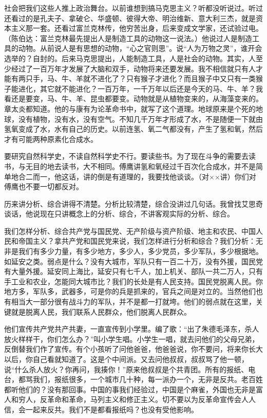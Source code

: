 社会把我们这些人推上政治舞台。以前谁想到搞马克思主义？听都没听说过。听过还看过的是孔夫子、拿破仑、华盛顿、彼得大帝、明治维新、意大利三杰，就是资本主义那一套。还看过富兰克林传，他穷苦出身，后来变成文学家，还试验过电。 （陈伯达：富兰克林最先提出人是制造工具的动物这一说法。）他说过人是制造工具的动物。从前说人是有思想的动物，“心之官则思”。说“人为万物之灵”，谁开会选举的？自封的。后来马克思提出，人能制造工具，人是社会的动物。其实，人至少经过了一百万年才发展了大脑和双手，动物将来还要发展。我不相信就只有人才能有两只手，马、牛、羊就不进化了？只有猴子才进化？而且猴子中又只有一类猴子能进化，其它就不能进化？一百万年，一千万年以后还是今天的马、牛、羊？我看还是要变，马、牛、羊、昆虫都要变。动物就是从植物变来的，从海藻变来的。章太炎都知道。他的与康有为论革命书中，就写了这个道理。地球原来是个死的地球，没有植物，没有水，没有空气。不知几千万年才形成了水，不是随便一下就由氢氧变成了水，水有自己的历史。以前连氢、氧二气都没有，产生了氢和氧，然后才有可能两种原素化合成水。

要研究自然科学史，不读自然科学史不行。要读些书。为了现在斗争的需要去读书，与无目的地去读书，大不相同。傅鹰讲氢和氧经过千百次化合成水，并不是简单地合二而一，他这话，讲的倒是有道理的，我要找他谈谈。（对××讲）你们对傅鹰也不要一切都反对。

历来讲分析、综合讲得不清楚。分析比较清楚，综合没讲过几句话。我曾找艾思奇谈话，他说现在只讲概念上的分析、综合，不讲客观实际的分析、综合。

我们怎样分析、综合共产党与国民党、无产阶级与资产阶级、地主和农民、中国人民和帝国主义？拿共产党和国民党来说，我们怎样进行分析和综合？我们分析：无非是我们有多少力量，有多少地方，多少人，多少党员，多少军队，多少根据地。如延安之类。弱点是什么？没有大城市，军队只有一百二十万，没有外援，国民党有大量外援。延安同上海比，延安只有七千人，加上机关、部队一共二万人，只有手工业和农业，怎能同大城市比？我们的长处是有人民支持。国民党脱离人民。你地方多，军队多，武器多，可是你的兵是抓来的，官兵之间是对立的。当然他们也有相当大一部分很有战斗力的军队，并不是都一打就垮。他们的弱点就在这里，关键就是脱离人民，我们联系人民群众，他们脱离人民群众。

他们宣传共产党共产共妻，一直宣传到小学里。编了歌：“出了朱德毛泽东，杀人放火样样干，你们怎么办？”叫小学生唱。小学生一唱，就去问他们的父母兄弟，反倒替我们作了宣传。有个小孩听了问他爸爸，他爸爸说，你不要问，将来你长大以后，你自己看就知道了。这是个中间派。又去问他叔叔，叔叔骂了他一顿，说“什么杀人放火？你再问，我揍你！”原来他叔叔是个共青团。所有的报纸、电台，都骂我们，报纸很多，一个城市几十种，每一派办一个，无非是反共。老百姓都听他们的？没有那回事。中国的事我们经验过，中国是个麻雀，外国也无非是富人和穷人，反革命和革命，马列主义和修正主义。切不要以为反革命宣传会人人信，会一起来反共。我们不是都看报纸吗？也没有受他影响。

